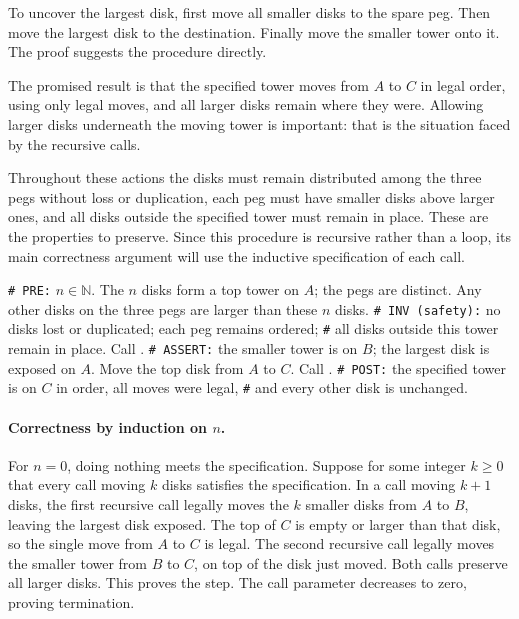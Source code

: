 To uncover the largest disk, first move all smaller disks to the spare
peg. Then move the largest disk to the destination. Finally move the
smaller tower onto it. The proof suggests the procedure directly.

The promised result is that the specified tower moves from $A$ to $C$
in legal order, using only legal moves, and all larger disks remain where
they were. Allowing larger disks underneath the moving tower is important:
that is the situation faced by the recursive calls.

Throughout these actions the disks must remain distributed among the
three pegs without loss or duplication, each peg must have smaller disks
above larger ones, and all disks outside the specified tower must remain
in place. These are the properties to preserve. Since this procedure is
recursive rather than a loop, its main correctness argument will use the
inductive specification of each call.

\begin{algorithm}[H]
\begin{algorithmic}[1]
\Statex \texttt{\# PRE:} $n\in\mathbb N$. The $n$ disks form a top tower on $A$; the pegs are distinct.
Any other disks on the three pegs are larger than these $n$ disks.
\Statex \texttt{\# INV (safety):} no disks lost or duplicated; each peg remains ordered;
\Statex \texttt{\#} all disks outside this tower remain in place.
\State Call .
\Statex \texttt{\# ASSERT:} the smaller tower is on $B$; the largest disk is exposed on $A$.
\State Move the top disk from $A$ to $C$.
\State Call .
\EndIf
\Statex \texttt{\# POST:} the specified tower is on $C$ in order, all moves were legal,
\Statex \texttt{\#} and every other disk is unchanged.
\EndProcedure
\end{algorithmic}
\caption{Move $n$ disks from the first named peg to the last, using the middle peg as spare.}
\end{algorithm}

\paragraph{Correctness by induction on $n$.}
For $n=0$, doing nothing meets the specification. Suppose for some integer
$k\geq0$ that every call moving $k$ disks satisfies the specification.
In a call moving $k+1$ disks, the first recursive call legally moves the
$k$ smaller disks from $A$ to $B$, leaving the largest disk exposed.
The top of $C$ is empty or larger than that disk, so the single move from
$A$ to $C$ is legal. The second recursive call legally moves the smaller
tower from $B$ to $C$, on top of the disk just moved. Both calls preserve
all larger disks. This proves the step. The call parameter decreases to
zero, proving termination.

